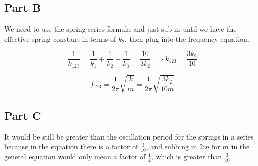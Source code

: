 \documentclass{article}
\begin{document}
\subsection {Part B}

We need to use the spring series formula and just sub in until we have the effective spring constant in terms of $k_2$, then plug into the frequency equation.

$$
\frac{1}{k_{123}}=\frac{1}{k_1}+\frac{1}{k_2}+\frac{1}{k_3} = \frac{10}{3 k_2} \implies k_{123} = \frac{3k_2}{10}
$$

$$
f_{123} = \frac{1}{2\pi}\sqrt{\frac{k}{m}} = \frac{1}{2\pi}\sqrt{\frac{3k_2}{10m}}
$$

\subsection {Part C}

It would be still be greater than the oscillation period for the springs in a series because in the equation there is a factor of $\frac{3}{10}$, and subbing in $2m$ for $m$ in the general equation would only mean a factor of $\frac{1}{2}$, which is greater than $\frac{3}{10}$.
\end{document}
